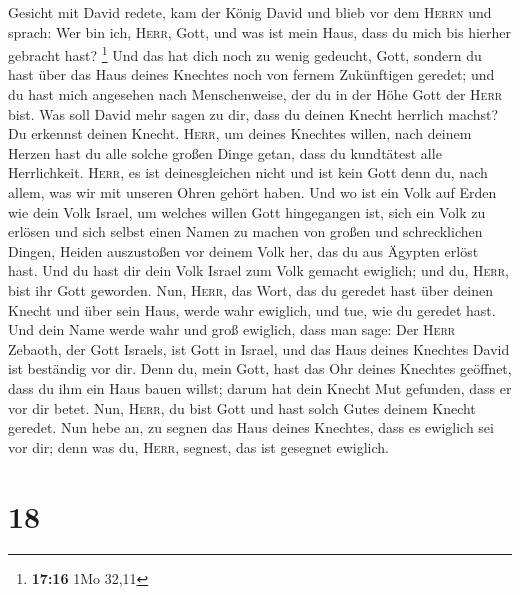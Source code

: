 Gesicht mit David redete,  kam der König David und blieb
vor dem \textsc{Herrn} und sprach: Wer bin ich, \textsc{Herr}, Gott, und
was ist mein Haus, dass du mich bis hierher gebracht hast? \footnote{\textbf{17:16}
  1Mo 32,11}  Und das hat dich noch zu wenig gedeucht,
Gott, sondern du hast über das Haus deines Knechtes noch von fernem
Zukünftigen geredet; und du hast mich angesehen nach Menschenweise, der
du in der Höhe Gott der \textsc{Herr} bist.  Was soll
David mehr sagen zu dir, dass du deinen Knecht herrlich machst? Du
erkennst deinen Knecht.  \textsc{Herr}, um deines
Knechtes willen, nach deinem Herzen hast du alle solche großen Dinge
getan, dass du kundtätest alle Herrlichkeit. 
\textsc{Herr}, es ist deinesgleichen nicht und ist kein Gott denn du,
nach allem, was wir mit unseren Ohren gehört haben.  Und
wo ist ein Volk auf Erden wie dein Volk Israel, um welches willen Gott
hingegangen ist, sich ein Volk zu erlösen und sich selbst einen Namen zu
machen von großen und schrecklichen Dingen, Heiden auszustoßen vor
deinem Volk her, das du aus Ägypten erlöst hast.  Und du
hast dir dein Volk Israel zum Volk gemacht ewiglich; und du,
\textsc{Herr}, bist ihr Gott geworden.  Nun,
\textsc{Herr}, das Wort, das du geredet hast über deinen Knecht und über
sein Haus, werde wahr ewiglich, und tue, wie du geredet hast.
 Und dein Name werde wahr und groß ewiglich, dass man
sage: Der \textsc{Herr} Zebaoth, der Gott Israels, ist Gott in Israel,
und das Haus deines Knechtes David ist beständig vor dir.
 Denn du, mein Gott, hast das Ohr deines Knechtes
geöffnet, dass du ihm ein Haus bauen willst; darum hat dein Knecht Mut
gefunden, dass er vor dir betet.  Nun, \textsc{Herr}, du
bist Gott und hast solch Gutes deinem Knecht geredet. 
Nun hebe an, zu segnen das Haus deines Knechtes, dass es ewiglich sei
vor dir; denn was du, \textsc{Herr}, segnest, das ist gesegnet ewiglich.

\hypertarget{section-17}{%
\section{18}\label{section-17}}

